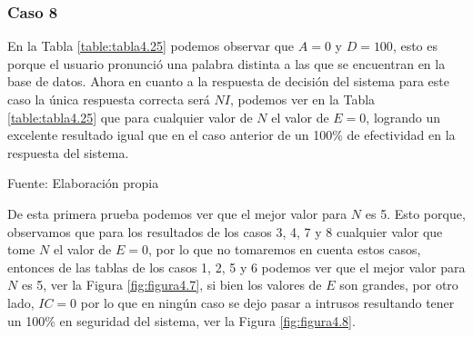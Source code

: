 \subsubsection{Caso 8}
En la Tabla \ref{table:tabla4.25} podemos observar que $A = 0$ y $D = 100$, esto es porque el usuario pronunció una palabra distinta a las que se encuentran en la base de datos.
\vskip 0.5cm
Ahora en cuanto a la respuesta de decisión del sistema para este caso la única respuesta correcta será $NI$, podemos ver en la Tabla \ref{table:tabla4.25} que para cualquier valor de $N$ el valor de $E = 0$, logrando un excelente resultado igual que en el caso anterior de un 100\% de efectividad en la respuesta del sistema.

\begin{center}
\begin{table}[H]
\centering
\caption{\small{Resultados para el caso 8 con U1 dinámico.}}
\label{table:tabla4.25}
\vskip 0.2cm
\begin{center}
\vskip 0.2cm
{\small{Fuente: Elaboración propia}}
\end{center}
\end{table}
\end{center}

De esta primera prueba podemos ver que el mejor valor para $N$ es 5. Esto porque, observamos que para los resultados de los casos 3, 4, 7 y 8 cualquier valor que tome $N$ el valor de $E = 0$, por lo que no tomaremos en cuenta estos casos, entonces de las tablas de los casos 1, 2, 5 y 6 podemos ver que el mejor valor para $N$ es 5, ver la Figura \ref{fig:figura4.7}, si bien los valores de $E$ son grandes, por otro lado, $IC = 0$ por lo que en ningún caso se dejo pasar a intrusos resultando tener un 100\% en seguridad del sistema, ver la Figura \ref{fig:figura4.8}.

